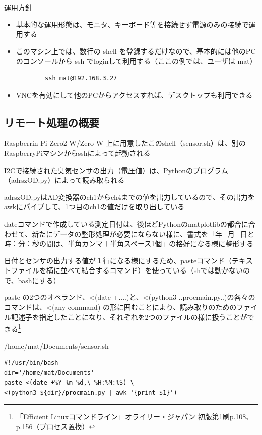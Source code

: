 \documentclass[12pt,a4paper,uplatex]{jsbook}
\begin{document}
運用方針

\begin{itemize}
	\item 基本的な運用形態は、モニタ、キーボード等を接続せず電源のみの接続で運用する
	\item このマシン上では、数行の shell を登録するだけなので、基本的には他のPCのコンソールから ssh でloginして利用する（ここの例では、ユーザは mat）
	\begin{verbatim}
		ssh mat@192.168.3.27
	\end{verbatim}
	\item VNCを有効にして他のPCからアクセスすれば、デスクトップも利用できる
\end{itemize}

\subsection{リモート処理の概要}

	Raspberrin Pi Zero2 W/Zero W  上に用意したこのshell（sensor.sh）は、別のRaspberryPiマシンからsshによって起動される
	
	I2Cで接続された臭気センサの出力（電圧値）は、Pythonのプログラム（adrszOD.py）によって読み取られる
	
	adrszOD.pyはAD変換器のch1からch4までの値を出力しているので、その出力をawkにパイプして、1つ目のch1の値だけを取り出している
	
	dateコマンドで作成している測定日付は、後ほどPythonのmatplotlibの都合に合わせて、新たにデータの整形処理が必要にならない様に、書式を「年−月−日と時：分：秒の間は、半角カンマ＋半角スペース1個」の格好になる様に整形する
	
	日付とセンサの出力する値が１行になる様にするため、pasteコマンド（テキストファイルを横に並べて結合するコマンド）を使っている\footnotemark[1]（shでは動かないので、bashにする）
	
	paste の2つのオペランド、<(date +....)と、<(python3 ..procmain.py..)の各々のコマンドは、<(any command) の形に囲むことにより、読み取りのためのファイル記述子を指定したことになり、それぞれを2つのファイルの様に扱うことができる\footnote[1]{「Efficient Linuxコマンドライン」オライリー・ジャパン 初版第1刷p.108、p.156（プロセス置換）}

\begin{itembox}[l]{/home/mat/Documents/sensor.sh}
	\begin{verbatim}
#!/usr/bin/bash
dir='/home/mat/Documents'
paste <(date +%Y-%m-%d,\ %H:%M:%S) \
<(python3 ${dir}/procmain.py | awk '{print $1}')
	\end{verbatim}
\end{itembox}
\end{document}
